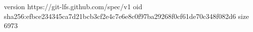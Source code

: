 version https://git-lfs.github.com/spec/v1
oid sha256:efbce234345ca7d21bcb3cf2e4c7e6e8c0f97ba29268f0cf61de70c348f082d6
size 6973
